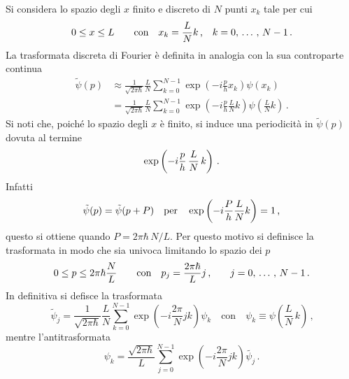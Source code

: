 Si considera lo spazio degli $x$ finito e discreto di $N$ punti $x_{k}$ tale per cui 
\begin{equation}
    \centering
    0 \le x \le L \qquad \text{con} \quad x_{k} = \frac{L}{N}  k \, \text{,} \quad  k = 0, \, \dots\, , \,  N-1 \, \text{.}
    \label{eq:x_space}
\end{equation}
La trasformata discreta di Fourier è definita in analogia con la sua controparte continua
\begin{equation}
    \begin{split}
        \tilde{\psi}(p) & \approx \frac{1}{\sqrt{2 \pi \hbar}} \frac{L}{N} \sum_{k=0}^{N-1}  \exp \left(-i \frac{p}{h} x_{k} \right) \psi(x_{k}) \\
        & = \frac{1}{\sqrt{2 \pi \hbar}} \frac{L}{N} \sum_{k=0}^{N-1}  \exp \left(-i \frac{p}{h} \frac{L}{N} k \right) \psi ( \frac{L}{N} k ) \, \text{.}
    \end{split}
    \label{eq:dft}
\end{equation}
Si noti che, poiché lo spazio degli $x$ è finito, si induce una periodicità in $\tilde{\psi}(p)$ dovuta al termine
\begin{equation}
    \centering
    \exp \left(-i \frac{p}{h} \, \frac{L}{N} \, k \right) \, \text{.}
\end{equation}
Infatti
\begin{equation}
    \centering
    \tilde{\psi}(p) = \tilde{\psi}(p + P) \quad \text{per}  \quad  \exp \left(-i \frac{P}{h} \frac{L}{N} k \right) = 1 \, \text{,}
    \label{eq:p_periodicity}
\end{equation}
questo si ottiene quando $P = 2 \pi \hbar \, N / L  $.
Per questo motivo si definisce la trasformata in modo che sia univoca limitando lo spazio dei $p$
\begin{equation}
    \centering
    0 \le p \le 2 \pi \hbar \frac{N}{L} \qquad \text{con}  \quad p_{j} = \frac{2 \pi \hbar}{L} j \, \text{,} \qquad  j = 0, \, \dots\,,\, N-1 \, \text{.}
    \label{eq:p_space}
\end{equation}
In definitiva si defisce la trasformata
\begin{equation}
    \tilde{\psi}_j = \frac{1}{\sqrt{2 \pi \hbar}} \frac{L}{N} \sum_{k=0}^{N-1}  \exp \left(-i \frac{2 \pi}{N} j k\right) \psi_k \quad \text{con}  \quad \psi_k \equiv \psi \left( \frac{L}{N} \, k \right) \, \text{,}
    \label{eq:dft_final}
\end{equation}
mentre l'antitrasformata
\begin{equation}
    \psi_k = \frac{\sqrt{2 \pi \hbar}}{L} \sum_{j=0}^{N-1}  \exp \left(-i \frac{2 \pi}{N} j k\right) \tilde{\psi_j} \, \text{.}
    \label{eq:dft_anti}
\end{equation}
